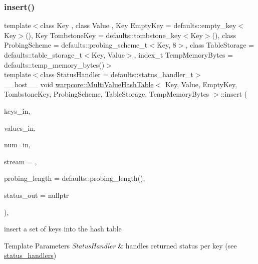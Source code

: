 \subsubsection{\texorpdfstring{insert()}{insert()}\hspace{0.1cm}{\footnotesize\ttfamily [2/2]}}
{\footnotesize\ttfamily template$<$class Key , class Value , Key Empty\+Key = defaults\+::empty\+\_\+key$<$\+Key$>$(), Key Tombstone\+Key = defaults\+::tombstone\+\_\+key$<$\+Key$>$(), class Probing\+Scheme  = defaults\+::probing\+\_\+scheme\+\_\+t$<$\+Key, 8$>$, class Table\+Storage  = defaults\+::table\+\_\+storage\+\_\+t$<$\+Key, Value$>$, index\+\_\+t Temp\+Memory\+Bytes = defaults\+::temp\+\_\+memory\+\_\+bytes()$>$ \\
template$<$class Status\+Handler  = defaults\+::status\+\_\+handler\+\_\+t$>$ \\
\+\_\+\+\_\+host\+\_\+\+\_\+ void \hyperlink{classwarpcore_1_1MultiValueHashTable}{warpcore\+::\+Multi\+Value\+Hash\+Table}$<$ Key, Value, Empty\+Key, Tombstone\+Key, Probing\+Scheme, Table\+Storage, Temp\+Memory\+Bytes $>$\+::insert (\begin{DoxyParamCaption}\item[{const key\+\_\+type $\ast$const}]{keys\+\_\+in,  }\item[{const value\+\_\+type $\ast$const}]{values\+\_\+in,  }\item[{const index\+\_\+type}]{num\+\_\+in,  }\item[{const cuda\+Stream\+\_\+t}]{stream = {},  }\item[{const index\+\_\+type}]{probing\+\_\+length = {\ttfamily defaults\+:\+:probing\+\_\+length()},  }\item[{typename Status\+Handler\+::base\+\_\+type $\ast$const}]{status\+\_\+out = {\ttfamily nullptr} }\end{DoxyParamCaption})\hspace{0.3cm}{\ttfamily [inline]}, {\ttfamily [noexcept]}}



insert a set of keys into the hash table 


\begin{DoxyTemplParams}{Template Parameters}
{\em Status\+Handler} & handles returned status per key (see {\ttfamily \hyperlink{namespacewarpcore_1_1status__handlers}{status\+\_\+handlers}}) \\
\hline
\end{DoxyTemplParams}

